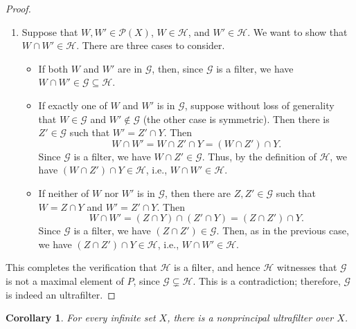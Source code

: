 \documentclass[a4paper]{memoir}
\newtheorem{corollary}[theorem]{Corollary}
\theoremstyle{definition}
\newcommand{\mc}{\mathcal}
\newcommand{\power}{\ensuremath{\mathscr{P}}}
\begin{document}
\begin{proof}
\begin{enumerate}
\begin{proof}
      To show that $Z' \cap Y = W'$, first fix $z \in Z' \cap Y$. Then $z \in Z'$ and $z \notin 
      (X \setminus Y)$. By the definition of $Z'$, we must have $z \in W'$. The other direction 
      is immediate: by the definition of $Z'$, we have $W' \subseteq Z'$.
    \end{proof}
    Since $Z \in \mc{G}$ and $\mc{G}$ is a filter, it follows that $Z' \in \mc{G}$. But then, 
    by the definition of $\mc{H}$, we have $Z' \cap Y = W' \in \mc{H}$.
    \item Suppose that $W,W' \in \power(X)$, $W \in \mc{H}$, and $W' \in \mc{H}$. We want to show 
    that $W \cap W' \in \mc{H}$. There are three cases to consider.
    \begin{itemize}
      \item If both $W$ and $W'$ are in $\mc{G}$, then, since $\mc{G}$ is a filter, we have 
      $W \cap W' \in \mc{G} \subseteq \mc{H}$.
      \item If exactly one of $W$ and $W'$ is in $\mc{G}$, suppose without loss of generality 
      that $W \in \mc{G}$ and $W' \notin \mc{G}$ (the other case is symmetric). 
      Then there is $Z' \in \mc{G}$ such that $W' = Z' \cap Y$. Then 
      \[
        W \cap W' = W \cap Z' \cap Y = (W \cap Z') \cap Y.
      \]
      Since $\mc{G}$ is a filter, we have $W \cap Z' \in \mc{G}$. Thus, by the definition of 
      $\mc{H}$, we have $(W \cap Z') \cap Y \in \mc{H}$, i.e., $W \cap W' \in \mc{H}$.
      \item If neither of $W$ nor $W'$ is in $\mc{G}$, then there are $Z,Z' \in \mc{G}$ 
      such that $W = Z \cap Y$ and $W' = Z' \cap Y$. Then
      \[
        W \cap W' = (Z \cap Y) \cap (Z' \cap Y) = (Z \cap Z') \cap Y.
      \]
      Since $\mc{G}$ is a filter, we have $(Z \cap Z') \in \mc{G}$. Then, as in the previous 
      case, we have $(Z \cap Z') \cap Y \in \mc{H}$, i.e., $W \cap W' \in \mc{H}$.
    \end{itemize}
  \end{enumerate}
  This completes the verification that $\mc{H}$ is a filter, and hence $\mc{H}$ witnesses that 
  $\mc{G}$ is not a maximal element of $P$, since $\mc{G} \subsetneq \mc{H}$. This is a contradiction; 
  therefore, $\mc{G}$ is indeed an ultrafilter.
\end{proof}

\begin{corollary}
  For every infinite set $X$, there is a nonprincipal ultrafilter over $X$.
\end{corollary}
\end{document}
